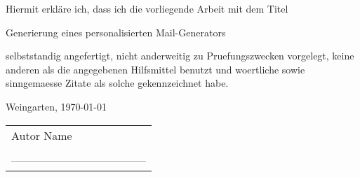
\thispagestyle{empty} %

Hiermit erkläre ich, dass ich die vorliegende Arbeit mit dem Titel \newline    %
\begin{center}
{\LARGE{Generierung eines personalisierten Mail-Generators}}
\end{center}
selbststandig angefertigt, nicht anderweitig zu Pruefungszwecken vorgelegt, keine anderen als die angegebenen Hilfsmittel benutzt und woertliche sowie sinngemaesse Zitate als solche gekennzeichnet habe.\newline  %

\begin{flushleft}
Weingarten, \today %
\end{flushleft}

\begin{tabular}{l}   
Autor Name        \\%
 \\
------------------------------------ \\
\end{tabular}




